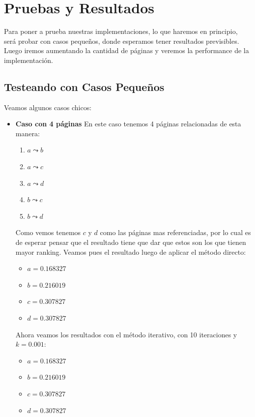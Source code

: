 \section{Pruebas y Resultados}

Para poner a prueba nuestras implementaciones, lo que haremos en principio, será probar con casos pequeños, donde esperamos tener resultados previsibles. Luego iremos aumentando la cantidad de páginas y veremos la performance de la implementación.

\subsection{Testeando con Casos Pequeños}

Veamos algunos casos chicos:

\begin{itemize}
    \item \textbf{Caso con 4 páginas} En este caso tenemos 4 páginas relacionadas de esta manera:
        \begin{enumerate}
            \item $a \leadsto b$
            \item $a \leadsto c$
            \item $a \leadsto d$
            \item $b \leadsto c$
            \item $b \leadsto d$
        \end{enumerate}

        Como vemos tenemos $c$ y $d$ como las páginas mas referenciadas, por lo cual es de esperar pensar que el resultado tiene que dar que estos son los que tienen mayor ranking. Veamos pues el resultado luego de aplicar el método directo:

        \begin{itemize}
            \item $a = 0.168327$
            \item $b = 0.216019$
            \item $c = 0.307827$
            \item $d = 0.307827$
        \end{itemize}

        Ahora veamos los resultados con el método iterativo, con 10 iteraciones y $k = 0.001$:

        \begin{itemize}
            \item $a = 0.168327$
            \item $b = 0.216019$
            \item $c = 0.307827$
            \item $d = 0.307827$
        \end{itemize}


\end{itemize}
